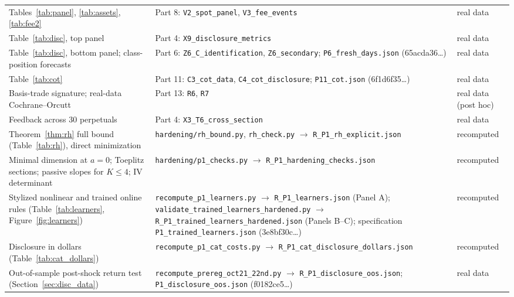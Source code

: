 \documentclass[12pt]{article}
\theoremstyle{definition}
\theoremstyle{remark}
\begin{document}
\begin{longtable}{p{}p{}p{}}
Tables~\ref{tab:panel}, \ref{tab:assets}, \ref{tab:fee2} & Part 8: \nolinkurl{V2_spot_panel}, \nolinkurl{V3_fee_events} & real data\\
Table~\ref{tab:disc}, top panel & Part 4: \nolinkurl{X9_disclosure_metrics} & real data\\
Table~\ref{tab:disc}, bottom panel; class-position forecasts & Part 6: \nolinkurl{Z6_C_identification}, \nolinkurl{Z6_secondary}; \nolinkurl{P6_fresh_days.json} (65acda36\ldots) & real data\\
Table~\ref{tab:cot} & Part 11: \nolinkurl{C3_cot_data}, \nolinkurl{C4_cot_disclosure}; \nolinkurl{P11_cot.json} (6f1d6f35\ldots) & real data\\
Basis-trade signature; real-data Cochrane--Orcutt & Part 13: \nolinkurl{R6}, \nolinkurl{R7} & real data (post hoc)\\
Feedback across 30 perpetuals & Part 4: \nolinkurl{X3_T6_cross_section} & real data\\
Theorem~\ref{thm:rh} full bound (Table~\ref{tab:rh}), direct minimization & \nolinkurl{hardening/rh_bound.py}, \nolinkurl{rh_check.py} $\to$ \nolinkurl{R_P1_rh_explicit.json} & recomputed\\
Minimal dimension at $a=0$; Toeplitz sections; passive slopes for $K\le4$; IV determinant & \nolinkurl{hardening/p1_checks.py} $\to$ \nolinkurl{R_P1_hardening_checks.json} & recomputed\\
Stylized nonlinear and trained online rules (Table~\ref{tab:learners}, Figure~\ref{fig:learners}) & \texttt{recompute\_\allowbreak p1\_\allowbreak learners.py} $\to$ \texttt{R\_P1\_\allowbreak learners.json} (Panel A); \texttt{validate\_\allowbreak trained\_\allowbreak learners\_\allowbreak hardened.py} $\to$ \texttt{R\_P1\_\allowbreak trained\_\allowbreak learners\_\allowbreak hardened.json} (Panels B--C); specification \texttt{P1\_\allowbreak trained\_\allowbreak learners.json} (3e8bf30c\ldots) & recomputed\\
Disclosure in dollars (Table~\ref{tab:cat_dollars}) & \texttt{recompute\_\allowbreak p1\_\allowbreak cat\_\allowbreak costs.py} $\to$ \texttt{R\_P1\_\allowbreak cat\_\allowbreak disclosure\_\allowbreak dollars.json} & recomputed\\
Out-of-sample post-shock return test (Section~\ref{sec:disc_data}) & \texttt{recompute\_\allowbreak prereg\_\allowbreak oct21\_\allowbreak 22nd.py} $\to$ \texttt{R\_P1\_\allowbreak disclosure\_\allowbreak oos.json}; \texttt{P1\_\allowbreak disclosure\_\allowbreak oos.json} (f0182ce5\ldots) & real data\\

\end{longtable}
\end{document}
